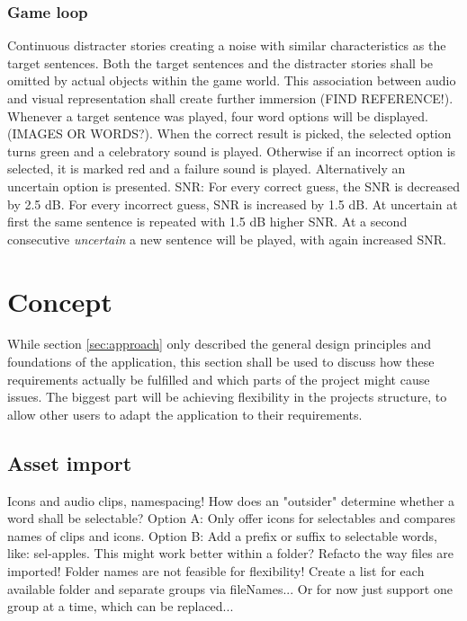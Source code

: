 \documentclass[a4paper,11pt]{article}%
\renewcommand{\\}{\vspace*{0.5\baselineskip} \newline}
\begin{document}
\subsubsection{Game loop}
Continuous distracter stories creating a noise with similar characteristics as the target sentences.
\newline
\newline
Both the target sentences and the distracter stories shall be omitted by actual objects within the game world. This association between audio and visual representation shall create further immersion (FIND REFERENCE!).
\newline
\newline
Whenever a target sentence was played, four word options will be displayed. (IMAGES OR WORDS?). When the correct result is picked, the selected option turns green and a celebratory sound is played. Otherwise if an incorrect option is selected, it is marked red and a failure sound is played. Alternatively an  \dq uncertain\dq{} option is presented.
\newline
\newline
SNR: For every correct guess, the SNR is decreased by 2.5 dB. For every incorrect guess, SNR is increased by 1.5 dB. At uncertain at first the same sentence is repeated with 1.5 dB higher SNR. At a second consecutive \textit{uncertain} a new sentence will be played, with again increased SNR.


\section{Concept}
\label{sec:concept}
While section \ref{sec:approach} only described the general design principles and foundations of the application, this section shall be used to discuss how these requirements  actually be fulfilled and which parts of the project might cause issues.
\newline
\newline
The biggest part will be achieving flexibility in the projects structure, to allow other users to adapt the application to their requirements.

\subsection{Asset import}
Icons and audio clips, namespacing!
\newline
How does an "outsider" determine whether a word shall be selectable?
\newline
Option A: Only offer icons for selectables and compares names of clips and icons.
\newline
Option B: Add a prefix or suffix to selectable words, like: \dq sel-apples\dq{}. This might work better within a folder?
\newline
\newline
Refacto the way files are imported! Folder names are not feasible for flexibility! Create a list for each available folder and separate groups via fileNames... Or for now just support one group at a time, which can be replaced...
\end{document}

